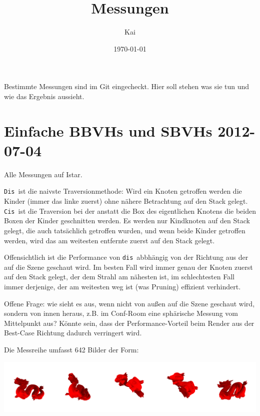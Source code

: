 \documentclass[a4paper,11pt]{article}
\title{Messungen}
\author{Kai}
\date{\today}
\begin{document}
\maketitle\thispagestyle{empty}
Bestimmte Messungen sind im Git eingecheckt. Hier soll stehen was sie tun und wie das Ergebnis aussieht.

\section{Einfache BBVHs und SBVHs \hfill 2012-07-04}

Alle Messungen auf Istar.

\newcommand\Cis{\texttt{Cis}\ }
\newcommand\Dis{\texttt{Dis}\ }
\newcommand\cis{\texttt{cis}\ }
\newcommand\dis{\texttt{dis}\ }
\newcommand\newword[1]{\marginpar{#1}}
\newcommand\frage{\marginpar{\tt \Large ?}}
\newcommand\todo{\marginpar{\tt \Large Todo!}}
\newcommand\file[1]{{\tt #1}}

\newword\dis
\Dis ist die naivste Traversionmethode: 
	Wird ein Knoten getroffen werden die Kinder (immer das linke zuerst) ohne nähere Betrachtung auf den Stack gelegt.
\newword\cis
\Cis ist die Traversion bei der anstatt die Box des eigentlichen Knotens die beiden Boxen der Kinder geschnitten werden. 
	Es werden nur Kindknoten auf den Stack gelegt, die auch tatsächlich getroffen wurden, und wenn beide Kinder
	getroffen werden, wird das am weitesten entfernte zuerst auf den Stack gelegt.

Offensichtlich ist die Performance von \dis abbhängig von der Richtung aus der auf die Szene geschaut wird.
Im besten Fall wird immer genau der Knoten zuerst auf den Stack gelegt, der dem Strahl am nähesten ist, 
	im schlechtesten Fall immer derjenige, der am weitesten weg ist (was Pruning) effizient verhindert.

Offene Frage: \frage wie sieht es aus, wenn nicht von außen auf die Szene geschaut wird, sondern von innen heraus, z.B. im Conf-Room eine
	sphärische Messung vom Mittelpunkt aus?
Könnte sein, dass der Performance-Vorteil beim Render aus der Best-Case Richtung dadurch verringert wird.

Die Messreihe umfasst 642 Bilder der Form:
\begin{center}
\includegraphics[width=\textwidth]{messreihe-bsp.png}
\end{center}
\end{document}
